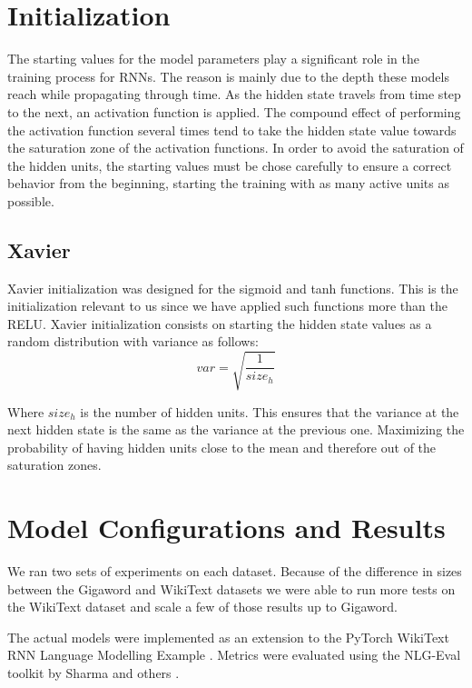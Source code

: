 \documentclass[a4paper]{article}
\begin{document}
\section{Initialization}
\label{sec:initialization}

The starting values for the model parameters play a significant role in the
training process for RNNs. The reason is mainly due to the depth these models
reach while propagating through time. As the hidden state travels from time step
to the next, an activation function is applied. The compound effect of
performing the activation function several times tend to take the hidden state
value towards the saturation zone of the activation functions. In order to avoid
the saturation of the hidden units, the starting values must be chose carefully
to ensure a correct behavior from the beginning, starting the training with as
many active units as possible.

\subsection{Xavier}
\label{sec:xavier}

Xavier initialization \cite{xavier10} was designed for the sigmoid and tanh
functions. This is the initialization relevant to us since we have applied such
functions more than the RELU. Xavier initialization consists on starting the
hidden state values as a random distribution with variance as follows: $$var =
\sqrt{\frac{1}{size_h}}$$

Where $size_h$ is the number of hidden units. This ensures that the variance at
the next hidden state is the same as the variance at the previous one.
Maximizing the probability of having hidden units close to the mean and
therefore out of the saturation zones.

\section{Model Configurations and Results}
\label{sec:results}

We ran two sets of experiments on each dataset. Because of the difference in sizes
between the Gigaword and WikiText datasets we were able to run more tests on the
WikiText dataset and scale a few of those results up to Gigaword.

The actual models were implemented as an extension to the PyTorch
WikiText RNN Language Modelling Example \cite{pytorchlm}. Metrics were
evaluated using the NLG-Eval toolkit by Sharma and others \cite{nlgeval}.
\end{document}
